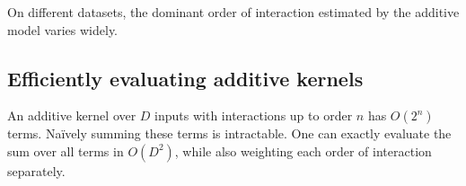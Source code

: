 On different datasets, the dominant order of interaction estimated by the additive model varies widely.
%
%






\subsection{Efficiently evaluating additive kernels}
An additive kernel over $D$ inputs with interactions up to order $n$ has $O(2^n)$ terms.
Na\"{i}vely summing these terms is intractable.
One can exactly evaluate the sum over all terms in $O(D^2)$, while also weighting each order of interaction separately.

